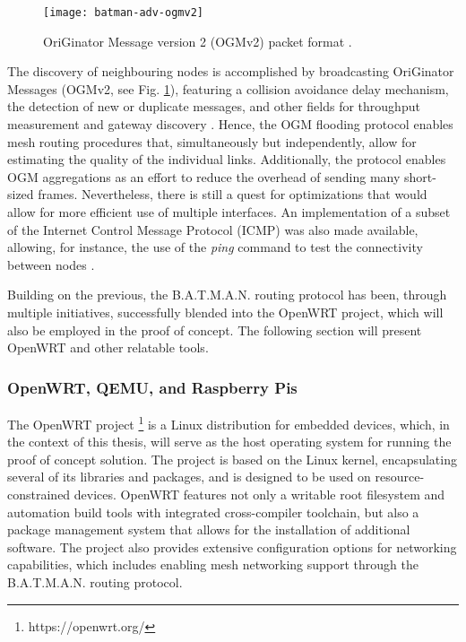 \begin{figure} [ht]
  \begin{center}
  \texttt{[image: batman-adv-ogmv2]}
  \caption{OriGinator Message version 2 (OGMv2) packet format \cite{cilfone2019wireless,open-mesh-ogmv2}.}
  \label{fig:batman-adv-ogmv2}
  \end{center}
\end{figure}

The discovery of neighbouring nodes is accomplished by broadcasting OriGinator Messages (OGMv2, see Fig. \ref{fig:batman-adv-ogmv2}), featuring a collision avoidance delay mechanism, the detection of new or duplicate messages, and other fields for throughput measurement and gateway discovery \cite{cilfone2019wireless}. Hence, the OGM flooding protocol enables mesh routing procedures that, simultaneously but independently, allow for estimating the quality of the individual links. Additionally, the protocol enables OGM aggregations as an effort to reduce the overhead of sending many short-sized frames. Nevertheless, there is still a quest for optimizations that would allow for more efficient use of multiple interfaces. An implementation of a subset of the Internet Control Message Protocol (ICMP) was also made available, allowing, for instance, the use of the \emph{ping} command to test the connectivity between nodes \cite{seither2011routing}.

Building on the previous, the B.A.T.M.A.N. routing protocol has been, through multiple initiatives, successfully blended into the OpenWRT project, which will also be employed in the proof of concept. The following section will present OpenWRT and other relatable tools.

\subsubsection{OpenWRT, QEMU, and Raspberry Pis}

The OpenWRT project \footnote{https://openwrt.org/} is a Linux distribution for embedded devices, which, in the context of this thesis, will serve as the host operating system for running the proof of concept solution. The project is based on the Linux kernel, encapsulating several of its libraries and packages, and is designed to be used on resource-constrained devices. OpenWRT features not only a writable root filesystem and automation build tools with integrated cross-compiler toolchain, but also a package management system that allows for the installation of additional software. The project also provides extensive configuration options for networking capabilities, which includes enabling mesh networking support through the B.A.T.M.A.N. routing protocol. 

